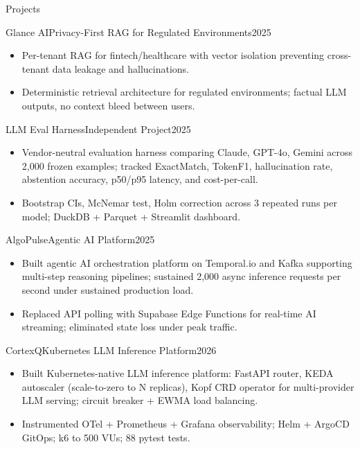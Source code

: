 \documentclass[]{mcdowellcv}
\begin{document}
\begin{cvsection}{Projects}
  \begin{cvsubsection}{Glance AI}{Privacy-First RAG for Regulated Environments}{2025}
    \begin{itemize}
      \item Per-tenant RAG for fintech/healthcare with vector isolation preventing cross-tenant data leakage and hallucinations.
      \item Deterministic retrieval architecture for regulated environments; factual LLM outputs, no context bleed between users.
    \end{itemize}
    \vspace{-1.5pt}
  \end{cvsubsection}

  \begin{cvsubsection}{LLM Eval Harness}{Independent Project}{2025}
    \begin{itemize}
      \item Vendor-neutral evaluation harness comparing Claude, GPT-4o, Gemini across 2,000 frozen examples; tracked ExactMatch, TokenF1, hallucination rate, abstention accuracy, p50/p95 latency, and cost-per-call.
      \item Bootstrap CIs, McNemar test, Holm correction across 3 repeated runs per model; DuckDB + Parquet + Streamlit dashboard.
    \end{itemize}
    \vspace{-1.5pt}
  \end{cvsubsection}

  \begin{cvsubsection}{AlgoPulse}{Agentic AI Platform}{2025}
    \begin{itemize}
      \item Built agentic AI orchestration platform on Temporal.io and Kafka supporting multi-step reasoning pipelines; sustained 2,000 async inference requests per second under sustained production load.
      \item Replaced API polling with Supabase Edge Functions for real-time AI streaming; eliminated state loss under peak traffic.
    \end{itemize}
    \vspace{-1.5pt}
  \end{cvsubsection}

  \begin{cvsubsection}{CortexQ}{Kubernetes LLM Inference Platform}{2026}
    \begin{itemize}
      \item Built Kubernetes-native LLM inference platform: FastAPI router, KEDA autoscaler (scale-to-zero to N replicas), Kopf CRD operator for multi-provider LLM serving; circuit breaker + EWMA load balancing.
      \item Instrumented OTel + Prometheus + Grafana observability; Helm + ArgoCD GitOps; k6 to 500 VUs; 88 pytest tests.
    \end{itemize}
  \end{cvsubsection}
\end{cvsection}
\end{document}
